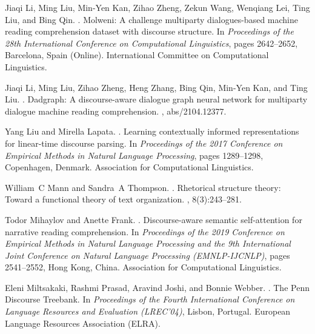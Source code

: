 \documentclass[11pt]{article}
\begin{document}
\begin{thebibliography}{}
Jiaqi Li, Ming Liu, Min-Yen Kan, Zihao Zheng, Zekun Wang, Wenqiang Lei, Ting
  Liu, and Bing Qin.
.
\newblock Molweni: A challenge multiparty dialogues-based machine reading
  comprehension dataset with discourse structure.
\newblock In {\em Proceedings of the 28th International Conference on
  Computational Linguistics}, pages 2642--2652, Barcelona, Spain (Online).
  International Committee on Computational Linguistics.

Jiaqi Li, Ming Liu, Zihao Zheng, Heng Zhang, Bing Qin, Min{-}Yen Kan, and Ting
  Liu.
.
\newblock Dadgraph: {A} discourse-aware dialogue graph neural network for
  multiparty dialogue machine reading comprehension.
, abs/2104.12377.

Yang Liu and Mirella Lapata.
.
\newblock Learning contextually informed representations for linear-time
  discourse parsing.
\newblock In {\em Proceedings of the 2017 Conference on Empirical Methods in
  Natural Language Processing}, pages 1289--1298, Copenhagen, Denmark.
  Association for Computational Linguistics.

William~C Mann and Sandra~A Thompson.
.
\newblock Rhetorical structure theory: Toward a functional theory of text
  organization.
, 8(3):243--281.

Todor Mihaylov and Anette Frank.
.
\newblock Discourse-aware semantic self-attention for narrative reading
  comprehension.
\newblock In {\em Proceedings of the 2019 Conference on Empirical Methods in
  Natural Language Processing and the 9th International Joint Conference on
  Natural Language Processing (EMNLP-IJCNLP)}, pages 2541--2552, Hong Kong,
  China. Association for Computational Linguistics.

Eleni Miltsakaki, Rashmi Prasad, Aravind Joshi, and Bonnie Webber.
.
\newblock The {P}enn {D}iscourse {T}reebank.
\newblock In {\em Proceedings of the Fourth International Conference on
  Language Resources and Evaluation ({LREC}{'}04)}, Lisbon, Portugal. European
  Language Resources Association (ELRA).


\end{thebibliography}
\end{document}
